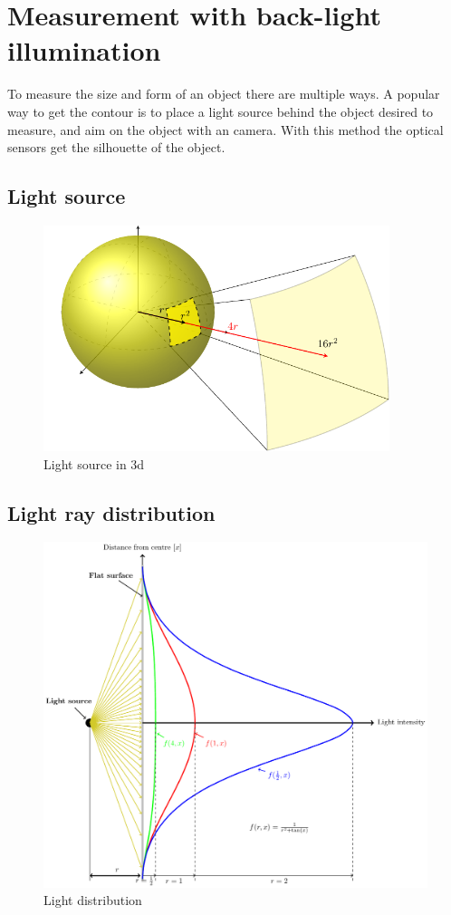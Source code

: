 \section{Measurement with back-light illumination}
To measure the size and form of an object there are multiple ways. A popular way to get the contour is to place a light source behind the object desired to measure, and aim on the object with an camera. With this method the optical sensors get the silhouette of the object. 
\subsection{Light source}


\begin{figure}[ht]
	\centering
	\includegraphics[width=0.9\textwidth]{2-theory/backlight/light.pdf}
	\caption{Light source in 3d\label{theory:light}}
\end{figure} 


\subsection{Light ray distribution}
\begin{figure}[ht]
	\centering
	\includegraphics[width=1\textwidth]{2-theory/backlight/lightsource.pdf}
	\caption{Light distribution\label{theory:lightdistribution}}
\end{figure} 
